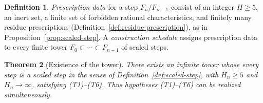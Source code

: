 \documentclass[11pt]{article}
\theoremstyle{plain}
\newtheorem{theorem}{Theorem}[section]
\theoremstyle{definition}
\newtheorem{definition}[theorem]{Definition}
\theoremstyle{remark}
\begin{document}
\begin{definition}\label{def:schedule}
\emph{Prescription data} for a step $F_n/F_{n-1}$ consist of an integer
$H\ge5$, an inert set, a finite set of forbidden rational
characteristics, and finitely many residue prescriptions
(Definition~\ref{def:residue-prescription}), as in
Proposition~\ref{prop:scaled-step}.  A \emph{construction schedule}
assigns prescription data to every finite tower
$F_0\subset\cdots\subset F_{n-1}$ of scaled steps.
\end{definition}

\begin{theorem}[Existence of the tower]\label{thm:construction}
There exists an infinite tower whose every step is a scaled step in
the sense of Definition~\ref{def:scaled-step}, with $H_n\ge5$ and
$H_n\to\infty$, satisfying \textup{(T1)--(T6)}.  Thus hypotheses
\textup{(T1)--(T6)} can be realized simultaneously.
\end{theorem}
\end{document}
